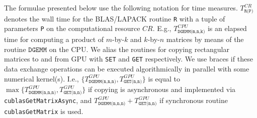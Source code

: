 \documentclass{llncs}
\begin{document}
The formulae presented below use the following notation for time measures.
$T^{CR}_{\texttt{R(P)}}$ denotes the wall time 
for the BLAS/LAPACK routine {\tt R} with a tuple of parameters {\tt P}
on the computational resource $CR$.
E.g., $T^{CPU}_{\texttt{DGEMM(m,n,k)}}$ is an elapsed time for 
computing a product of $m$-by-$k$ and $k$-by-$n$ matrices
by means of the routine $\texttt{DGEMM}$ on the CPU.
We alias the routines for copying rectangular matrices to and from GPU 
with {\tt SET} and {\tt GET} respectively.
We use braces if 
these data exchange operations can be executed algorithmically 
in parallel with some numerical kernel(s).
I.e., $\{T_{\texttt{DGEMM(n,n,n)}}^{GPU},T^{GPU}_{\texttt{GET(n,n)}}\}$ is equal to 
$\max\{T_{\texttt{DGEMM(n,n,n)}}^{GPU},T^{GPU}_{\texttt{GET(n,n)}}\}$ 
if copying is asynchronous and implemented 
via {\tt cublasGetMatrixAsync}, 
and $T_{\texttt{DGEMM(n,n,n)}}^{GPU}+T^{GPU}_{\texttt{GET(n,n)}}$ 
if synchronous routine {\tt cublasGetMatrix} is used.
\end{document}
